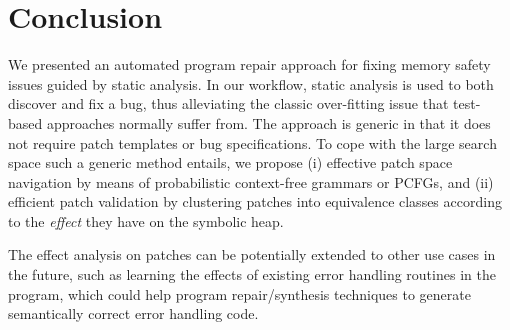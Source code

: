 \section{Conclusion}
\label{sec:conclusion}
We presented an automated program repair approach for fixing memory safety issues guided by static analysis. In our workflow, static analysis is used to both discover and fix a bug, thus alleviating the classic over-fitting issue that test-based approaches normally suffer from. The approach is generic in that it does not require patch templates or bug specifications. To cope with the large search space such a generic method entails, we propose (i) effective patch space navigation by means of probabilistic context-free grammars or PCFGs,  and (ii) efficient patch validation by clustering patches into equivalence classes according to the \emph{effect} they have on the symbolic heap. 

The effect analysis on patches can be potentially extended to other use cases in the future, such as learning the effects of existing error handling routines in the program, which could help program repair/synthesis techniques to generate semantically correct error handling code. 

